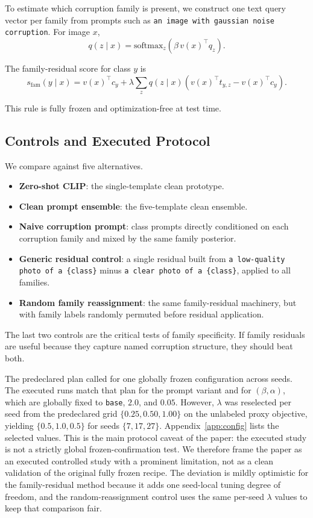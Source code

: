 \documentclass{article}
\newcommand{\vz}{v(x)}
\newcommand{\cy}{c_y}
\newcommand{\qzx}{q(z \mid x)}
\begin{document}
To estimate which corruption family is present, we construct one text query vector per family from prompts such as \texttt{an image with gaussian noise corruption}. For image $x$,
\begin{equation}
\qzx = \mathrm{softmax}_z\!\left(\beta \, \vz^\top q_z\right).
\end{equation}

The family-residual score for class $y$ is
\begin{equation}
s_{\mathrm{fam}}(y \mid x) =
\vz^\top \cy +
\lambda \sum_z \qzx \left(\vz^\top t_{y,z} - \vz^\top \cy\right).
\end{equation}

This rule is fully frozen and optimization-free at test time.

\subsection{Controls and Executed Protocol}

We compare against five alternatives.
\begin{itemize}
  \item \textbf{Zero-shot CLIP}: the single-template clean prototype.
  \item \textbf{Clean prompt ensemble}: the five-template clean ensemble.
  \item \textbf{Naive corruption prompt}: class prompts directly conditioned on each corruption family and mixed by the same family posterior.
  \item \textbf{Generic residual control}: a single residual built from \texttt{a low-quality photo of a \{class\}} minus \texttt{a clear photo of a \{class\}}, applied to all families.
  \item \textbf{Random family reassignment}: the same family-residual machinery, but with family labels randomly permuted before residual application.
\end{itemize}

The last two controls are the critical tests of family specificity. If family residuals are useful because they capture named corruption structure, they should beat both.

The predeclared plan called for one globally frozen configuration across seeds. The executed runs match that plan for the prompt variant and for $(\beta,\alpha)$, which are globally fixed to \texttt{base}, $2.0$, and $0.05$. However, $\lambda$ was reselected per seed from the predeclared grid $\{0.25, 0.50, 1.00\}$ on the unlabeled proxy objective, yielding $\{0.5, 1.0, 0.5\}$ for seeds $\{7,17,27\}$. Appendix~\ref{app:config} lists the selected values. This is the main protocol caveat of the paper: the executed study is not a strictly global frozen-confirmation test. We therefore frame the paper as an executed controlled study with a prominent limitation, not as a clean validation of the original fully frozen recipe. The deviation is mildly optimistic for the family-residual method because it adds one seed-local tuning degree of freedom, and the random-reassignment control uses the same per-seed $\lambda$ values to keep that comparison fair.
\end{document}
